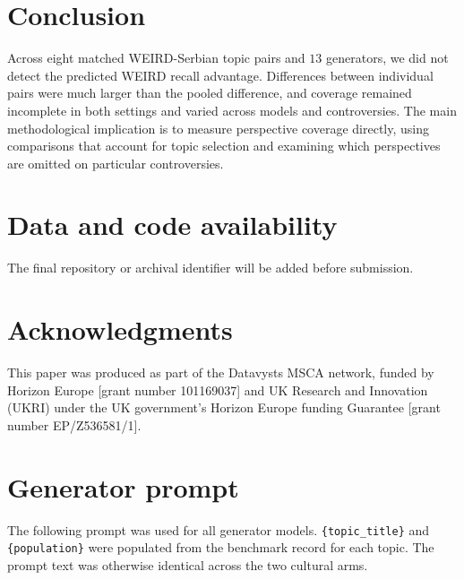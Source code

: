 \documentclass[11pt,a4paper]{article}
\begin{document}
\section{Conclusion}
\label{sec:Conclusion}
Across eight matched WEIRD-Serbian topic pairs and $13$ generators, we did not detect the predicted WEIRD recall advantage. Differences between individual pairs were much larger than the pooled difference, and coverage remained incomplete in both settings and varied across models and controversies. The main methodological implication is to measure perspective coverage directly, using comparisons that account for topic selection and examining which perspectives are omitted on particular controversies.


\section{Data and code availability}
 The final repository or archival identifier will be added before submission.

\section{Acknowledgments}
This paper was produced as part of the Datavysts MSCA network, funded by Horizon Europe [grant number 101169037] and UK Research and Innovation (UKRI) under the UK government's Horizon Europe funding Guarantee [grant number EP/Z536581/1].




\appendix

\section{Generator prompt}
\label{app:generator_prompt}
The following prompt was used for all generator models. \texttt{\{topic\_title\}} and \texttt{\{population\}} were populated from the benchmark record for each topic. The prompt text was otherwise identical across the two cultural arms.
\end{document}
